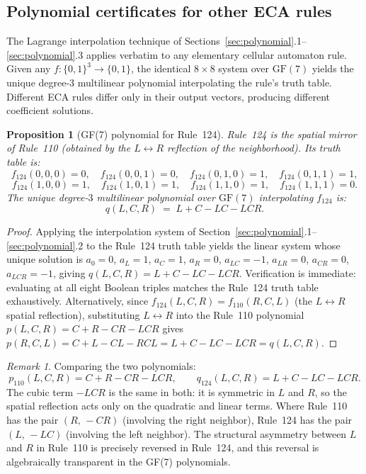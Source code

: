 \documentclass[11pt]{article}
\newtheorem{proposition}[theorem]{Proposition}
\theoremstyle{remark}
\newtheorem{remark}[theorem]{Remark}
\begin{document}
\subsection{Polynomial certificates for other ECA rules}
\label{sec:ECA-poly}

The Lagrange interpolation technique of Sections~\ref{sec:polynomial}.1--\ref{sec:polynomial}.3
applies verbatim to any elementary cellular automaton rule.
Given any $f : \{0,1\}^3 \to \{0,1\}$, the identical $8\times 8$ system over $\mathrm{GF}(7)$
yields the unique degree-3 multilinear polynomial interpolating the rule's truth table.
Different ECA rules differ only in their output vectors, producing different coefficient solutions.

\begin{proposition}[GF(7) polynomial for Rule~124]
\label{prop:rule124}
Rule~124 is the spatial mirror of Rule~110 (obtained by the $L \leftrightarrow R$
reflection of the neighborhood).
Its truth table is:
\[
  f_{124}(0,0,0)=0,\quad
  f_{124}(0,0,1)=0,\quad
  f_{124}(0,1,0)=1,\quad
  f_{124}(0,1,1)=1,
\]
\[
  f_{124}(1,0,0)=1,\quad
  f_{124}(1,0,1)=1,\quad
  f_{124}(1,1,0)=1,\quad
  f_{124}(1,1,1)=0.
\]
The unique degree-$3$ multilinear polynomial over $\mathrm{GF}(7)$ interpolating
$f_{124}$ is:
\[
  q(L,C,R) \;=\; L + C - LC - LCR.
\]
\end{proposition}

\begin{proof}
Applying the interpolation system of Section~\ref{sec:polynomial}.1--\ref{sec:polynomial}.2
to the Rule~124 truth table yields the linear system whose unique solution is
$a_0 = 0$, $a_L = 1$, $a_C = 1$, $a_R = 0$, $a_{LC} = -1$, $a_{LR} = 0$,
$a_{CR} = 0$, $a_{LCR} = -1$, giving $q(L,C,R) = L + C - LC - LCR$.
Verification is immediate: evaluating at all eight Boolean triples matches
the Rule~124 truth table exhaustively.
Alternatively, since $f_{124}(L,C,R) = f_{110}(R,C,L)$ (the $L\leftrightarrow R$
spatial reflection), substituting $L \leftrightarrow R$ into the Rule~110
polynomial $p(L,C,R) = C + R - CR - LCR$ gives
$p(R,C,L) = C + L - CL - RCL = L + C - LC - LCR = q(L,C,R)$.
\end{proof}

\begin{remark}
Comparing the two polynomials:
\[
  p_{110}(L,C,R) = C + R - CR - LCR, \qquad
  q_{124}(L,C,R) = L + C - LC - LCR.
\]
The cubic term $-LCR$ is the same in both: it is symmetric in $L$ and $R$, so
the spatial reflection acts only on the quadratic and linear terms.
Where Rule~110 has the pair $(R,\,-CR)$ (involving the right neighbor), Rule~124
has the pair $(L,\,-LC)$ (involving the left neighbor).
The structural asymmetry between $L$ and $R$ in Rule~110 is precisely reversed in
Rule~124, and this reversal is algebraically transparent in the GF(7) polynomials.
\end{remark}
\end{document}
